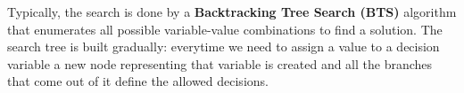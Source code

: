 Typically, the search is done by a \textbf{Backtracking Tree Search (BTS)} algorithm that enumerates all possible variable-value combinations to find a solution.
The search tree is built gradually: everytime we need to assign a value to a decision variable a new node representing that variable is created and all 
the branches that come out of it define the allowed decisions.